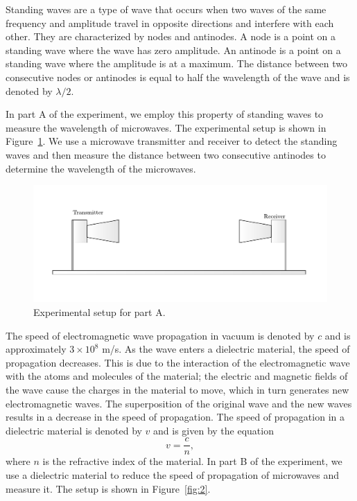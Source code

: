\documentclass[10pt]{article}
\begin{document}
Standing waves are a type of wave that occurs when two waves of the same frequency and amplitude travel in opposite directions and interfere with each other. They are characterized by nodes and antinodes. A node is a point on a standing wave where the wave has zero amplitude. An antinode is a point on a standing wave where the amplitude is at a maximum. The distance between two consecutive nodes or antinodes is equal to half the wavelength of the wave and is denoted by $\lambda/2$.

In part A of the experiment, we employ this property of standing waves to measure the wavelength of microwaves. The experimental setup is shown in Figure~\ref{fig:1}.
We use a microwave transmitter and receiver to detect the standing waves and then measure the distance between two consecutive antinodes to determine the wavelength of the microwaves.

\begin{figure}[ht]
  \centering
  \includegraphics[scale=0.4]{figures/f1.pdf}
  \caption{Experimental setup for part A.}
  \label{fig:1}
\end{figure}

The speed of electromagnetic wave propagation in vacuum is denoted by $c$ and is approximately $3 \times 10^8$ m/s. As the wave enters a dielectric material, the speed of propagation decreases. This is due to the interaction of the electromagnetic wave with the atoms and molecules of the material; the electric and magnetic fields of the wave cause the charges in the material to move, which in turn generates new electromagnetic waves. The superposition of the original wave and the new waves results in a decrease in the speed of propagation. The speed of propagation in a dielectric material is denoted by $v$ and is given by the equation
\begin{equation}
  v = \frac{c}{n},
\end{equation}
where $n$ is the refractive index of the material. In part B of the experiment, we use a dielectric material to reduce the speed of propagation of microwaves and measure it. The setup is shown in Figure~\ref{fig:2}.
\end{document}

